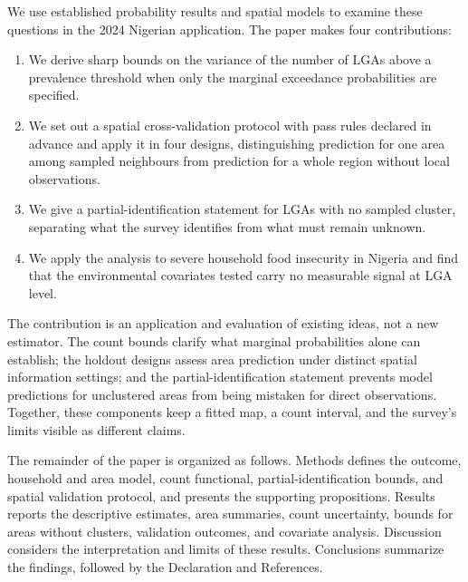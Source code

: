 We use established probability results and spatial models to examine these questions in the 2024 Nigerian application. The paper makes four contributions:
\begin{enumerate}
  \item We derive sharp bounds on the variance of the number of LGAs above a prevalence threshold when only the marginal exceedance probabilities are specified.
  \item We set out a spatial cross-validation protocol with pass rules declared in advance and apply it in four designs, distinguishing prediction for one area among sampled neighbours from prediction for a whole region without local observations.
  \item We give a partial-identification statement for LGAs with no sampled cluster, separating what the survey identifies from what must remain unknown.
  \item We apply the analysis to severe household food insecurity in Nigeria and find that the environmental covariates tested carry no measurable signal at LGA level.
\end{enumerate}
The contribution is an application and evaluation of existing ideas, not a new estimator. The count bounds clarify what marginal probabilities alone can establish; the holdout designs assess area prediction under distinct spatial information settings; and the partial-identification statement prevents model predictions for unclustered areas from being mistaken for direct observations. Together, these components keep a fitted map, a count interval, and the survey's limits visible as different claims.

The remainder of the paper is organized as follows. Methods defines the outcome, household and area model, count functional, partial-identification bounds, and spatial validation protocol, and presents the supporting propositions. Results reports the descriptive estimates, area summaries, count uncertainty, bounds for areas without clusters, validation outcomes, and covariate analysis. Discussion considers the interpretation and limits of these results. Conclusions summarize the findings, followed by the Declaration and References.
